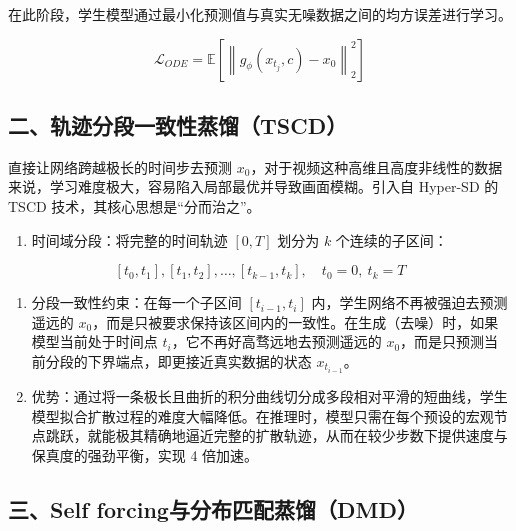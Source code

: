 在此阶段，学生模型通过最小化预测值与真实无噪数据之间的均方误差进行学习。

\[
\mathcal{L}_{ODE}=\mathbb{E}\left[\left\|g_\phi(x_{t_j},c)-x_0\right\|_2^2\right]
\]

\hypertarget{ux4e8cux8f68ux8ff9ux5206ux6bb5ux4e00ux81f4ux6027ux84b8ux998ftscd}{%
\subsection{二、轨迹分段一致性蒸馏（TSCD）}\label{ux4e8cux8f68ux8ff9ux5206ux6bb5ux4e00ux81f4ux6027ux84b8ux998ftscd}}

直接让网络跨越极长的时间步去预测 \(x_0\)，对于视频这种高维且高度非线性的数据来说，学习难度极大，容易陷入局部最优并导致画面模糊。引入自 Hyper-SD 的 TSCD 技术，其核心思想是``分而治之''。

\begin{enumerate}
\def\labelenumi{\arabic{enumi}.}
\tightlist
\item
{}
  时间域分段：将完整的时间轨迹 \([0,T]\) 划分为 \(k\) 个连续的子区间：
\end{enumerate}

\[
[t_0,t_1],[t_1,t_2],\ldots,[t_{k-1},t_k],\quad t_0=0,\ t_k=T
\]

\begin{enumerate}
\def\labelenumi{\arabic{enumi}.}
\setcounter{enumi}{1}
\item
  分段一致性约束：在每一个子区间 \([t_{i-1},t_i]\) 内，学生网络不再被强迫去预测遥远的 \(x_0\)，而是只被要求保持该区间内的一致性。在生成（去噪）时，如果模型当前处于时间点 \(t_i\)，它不再好高骛远地去预测遥远的 \(x_0\)，而是只预测当前分段的下界端点，即更接近真实数据的状态 \(x_{t_{i-1}}\)。
\item
  优势：通过将一条极长且曲折的积分曲线切分成多段相对平滑的短曲线，学生模型拟合扩散过程的难度大幅降低。在推理时，模型只需在每个预设的宏观节点跳跃，就能极其精确地逼近完整的扩散轨迹，从而在较少步数下提供速度与保真度的强劲平衡，实现 4 倍加速。
\end{enumerate}

\hypertarget{ux4e09self-forcingux4e0eux5206ux5e03ux5339ux914dux84b8ux998fdmd}{%
\subsection{三、Self forcing与分布匹配蒸馏（DMD）}\label{ux4e09self-forcingux4e0eux5206ux5e03ux5339ux914dux84b8ux998fdmd}}

